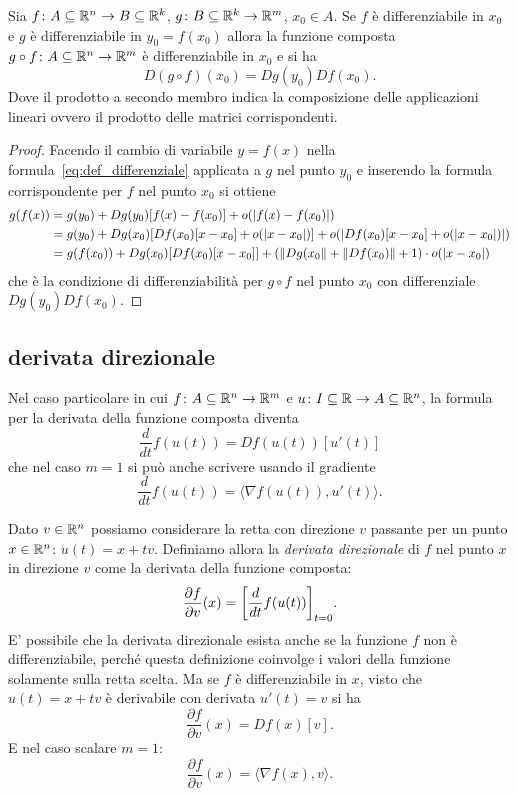 \begin{theorem}
  Sia $ f\colon A \subseteq {\mathbb R}^n \to B\subseteq {\mathbb R}^k$,
  $ g\colon B\subseteq {\mathbb R}^k \to {\mathbb R}^m$, $x_0\in A$.
  Se $ f$ è differenziabile in $x_0$ 
  e $ g$ è differenziabile in $y_0 =  f(x_0)$ 
  allora la funzione composta $g\circ  f\colon A \subseteq {\mathbb R}^n \to {\mathbb R}^m$
  è differenziabile in $x_0$ e si ha 
  \[
    D (g \circ  f)(x_0) 
    = D g(y_0) D f(x_0).
  \]
  Dove il prodotto a secondo membro indica la composizione 
  delle applicazioni lineari ovvero il prodotto delle matrici corrispondenti.
\end{theorem}
%
\begin{proof}
  Facendo il cambio di variabile $y = f(x)$ nella formula~\eqref{eq:def_differenziale}
  applicata a $g$ nel punto $y_0$
  e inserendo la formula corrispondente per $f$ nel punto $x_0$ si ottiene
  \begin{align*}
     g(f(x)) 
    & =  g( y_0) 
        + D g(y_0)[ f(x)- f(x_0)]
        + o({\left|f(x)-  f(x_0)\right|})\\
    & =  g(y_0) 
        + D g(x_0)[D f(x_0)[x - x_0] 
          + o({\left| x - x_0\right|})]
        + o({\left|D f(x_0)[x - x_0] 
          + o({\left|x - x_0\right|})\right|})\\
    & =  g(f(x_0))
       + Dg(x_0)[Df(x_0)[x - x_0]]
       + ({\left\Vert Dg(x_0\right\Vert} + {\left\Vert Df(x_0)\right\Vert} + 1)\cdot o({\left| x -  x_0\right|})
  \end{align*}
  che è la condizione di differenziabilità per $ g \circ  f$ 
  nel punto $ x_0$ con differenziale $Dg(y_0) Df(x_0)$.
\end{proof}

\subsection{derivata direzionale}

Nel caso particolare in cui 
$f\colon A\subseteq {\mathbb R}^n \to {\mathbb R}^m$ e $u\colon I\subseteq {\mathbb R}\to A\subseteq {\mathbb R}^n$,
la formula per la derivata della funzione composta diventa
\[
  \frac{d}{dt}  f(u(t))
  = Df(u(t))[u'(t)]
\]
che nel caso $m=1$ si può anche scrivere usando il gradiente
\[
  \frac{d}{dt} f(u(t))
  = \langle \nabla f( u(t)), u'(t)\rangle.
\]

Dato $v\in{\mathbb R}^n$ possiamo considerare la retta con direzione $v$
passante per un punto $x\in {\mathbb R}^n$: $u(t) =  x + t v$.
Definiamo allora la \emph{derivata direzionale} di $f$ nel punto $x$
in direzione $v$ come la derivata della funzione composta:
\[
   \frac{\partial  f}{\partial  v}(x)
   = {\left[ \frac {d}{dt}  f(u(t)) \right]}_{t=0}.
\]
E' possibile che la derivata direzionale esista anche se la funzione $f$ 
non è differenziabile, perché questa definizione coinvolge i valori della funzione 
solamente sulla retta scelta.
Ma se $f$ è differenziabile in $x$, visto che $u(t)= x + t v$ 
è derivabile con derivata $u'(t) =  v$ si ha 
\[
  \frac{\partial f}{\partial v} (x)
  = Df(x) [v].
\]
E nel caso scalare $m=1$:
\[
  \frac{\partial f}{\partial  v} ( x)
  = \langle \nabla f(x),  v\rangle.
\]

